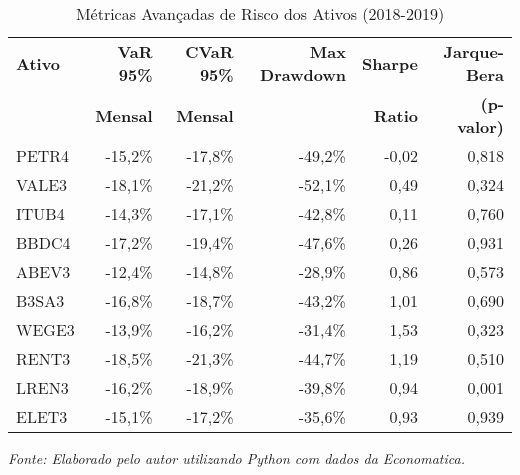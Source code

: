 \begin{table}[H]
\centering
\caption{Métricas Avançadas de Risco dos Ativos (2018-2019)}
\begin{tabular}{|l|r|r|r|r|r|}
\hline
\textbf{Ativo} & \textbf{VaR 95\%} & \textbf{CVaR 95\%} & \textbf{Max Drawdown} & \textbf{Sharpe} & \textbf{Jarque-Bera} \\
& \textbf{Mensal} & \textbf{Mensal} & & \textbf{Ratio} & \textbf{(p-valor)} \\
\hline
PETR4 & -15,2\% & -17,8\% & -49,2\% & -0,02 & 0,818 \\
\hline
VALE3 & -18,1\% & -21,2\% & -52,1\% & 0,49 & 0,324 \\
\hline
ITUB4 & -14,3\% & -17,1\% & -42,8\% & 0,11 & 0,760 \\
\hline
BBDC4 & -17,2\% & -19,4\% & -47,6\% & 0,26 & 0,931 \\
\hline
ABEV3 & -12,4\% & -14,8\% & -28,9\% & 0,86 & 0,573 \\
\hline
B3SA3 & -16,8\% & -18,7\% & -43,2\% & 1,01 & 0,690 \\
\hline
WEGE3 & -13,9\% & -16,2\% & -31,4\% & 1,53 & 0,323 \\
\hline
RENT3 & -18,5\% & -21,3\% & -44,7\% & 1,19 & 0,510 \\
\hline
LREN3 & -16,2\% & -18,9\% & -39,8\% & 0,94 & 0,001 \\
\hline
ELET3 & -15,1\% & -17,2\% & -35,6\% & 0,93 & 0,939 \\
\hline
\end{tabular}

\textit{Fonte: Elaborado pelo autor utilizando Python com dados da Economatica.}
\label{tab:risk_metrics}
\end{table}
